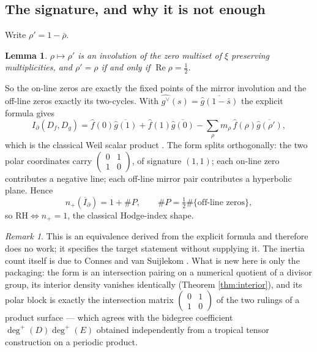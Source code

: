 \documentclass[11pt]{amsart}
\newtheorem{lemma}[theorem]{Lemma}
\theoremstyle{definition}
\theoremstyle{remark}
\newtheorem{remark}[theorem]{Remark}
\newcommand{\RH}{\mathrm{RH}}
\newcommand{\Rel}{\operatorname{Re}}
\begin{document}
\subsection{The signature, and why it is not enough}

Write $\rho'=1-\bar\rho$.

\begin{lemma}\label{lem:mirror}
$\rho\mapsto\rho'$ is an involution of the zero multiset of $\xi$ preserving
multiplicities, and $\rho'=\rho$ if and only if $\Rel\rho=\tfrac12$.
\end{lemma}

So the on-line zeros are exactly the fixed points of the mirror involution
and the off-line zeros exactly its two-cycles.  With
$\widehat{g^\vee}(s)=\overline{\widehat g(1-\bar s)}$ the explicit
formula gives
\begin{equation}\label{eq:evalcoords}
 I_\partial(D_f,D_g)=
 \widehat f(0)\overline{\widehat g(1)}+\widehat f(1)\overline{\widehat g(0)}
 -\sum_\rho m_\rho\,\widehat f(\rho)\overline{\widehat g(\rho')},
\end{equation}
which is the classical Weil scalar product \cite{Lagarias2007}.  The form
splits orthogonally: the two polar coordinates carry
$\left(\begin{smallmatrix}0&1\\1&0\end{smallmatrix}\right)$, of signature
$(1,1)$; each on-line zero contributes a negative line; each off-line mirror
pair contributes a hyperbolic plane.  Hence
\begin{equation}
 n_+(\overline I_\partial)=1+\#P,\qquad
 \#P=\tfrac12\#\{\text{off-line zeros}\},
\end{equation}
so $\RH\iff n_+=1$, the classical Hodge-index shape.

\begin{remark}
This is an equivalence derived from the explicit formula and therefore does
no work; it specifies the target statement without supplying it.  The
inertia count itself is due to Connes and van Suijlekom \cite{CvS}.  What is
new here is only the packaging: the form is an intersection pairing on a
numerical quotient of a divisor group, its interior density vanishes
identically (Theorem \ref{thm:interior}), and its polar block is exactly the
intersection matrix $\left(\begin{smallmatrix}0&1\\1&0\end{smallmatrix}\right)$
of the two rulings of a product surface --- which agrees with the bidegree
coefficient $\deg^+(D)\deg^+(E)$ obtained independently from a tropical
tensor construction on a periodic product.
\end{remark}
\end{document}
